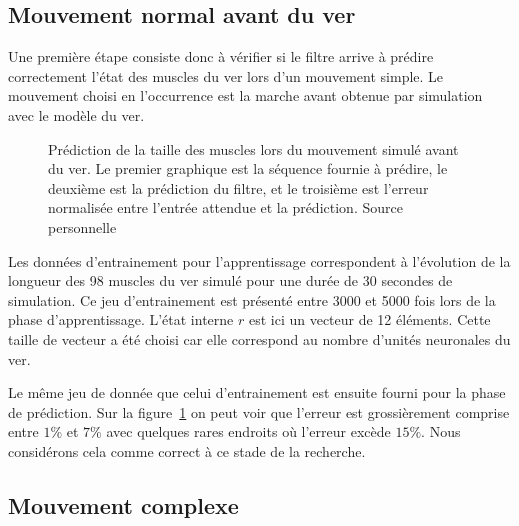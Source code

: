\subsection{Mouvement normal avant du ver} %
\label{sub:Mouvement normal avant du ver}

Une première étape consiste donc à vérifier si le filtre arrive à prédire 
correctement l'état des muscles du ver lors d'un mouvement simple. Le mouvement
choisi en l'occurrence est la marche avant obtenue par simulation avec le
modèle du ver.

\begin{figure}[ht]
   \begin{center}
   \end{center}
   \caption[Prédiction de la taille des muscles lors du mouvement simulé
   avant du ver]{Prédiction de la taille des muscles lors du mouvement simulé
   avant du ver. Le premier graphique est la séquence fournie à prédire, le
   deuxième est la prédiction du filtre, et le troisième est l'erreur normalisée
   entre l'entrée attendue et la prédiction. Source personnelle}
   \label{fig:sequence_ver_complet}
\end{figure}

Les données d'entrainement pour l'apprentissage correspondent à l'évolution de
la longueur des 98 muscles du ver simulé pour une durée de 30 secondes de
simulation. Ce jeu d'entrainement est présenté entre 3000 et 5000 fois lors de la
phase d'apprentissage. L'état interne $r$ est ici un vecteur de 12 éléments.
Cette taille de vecteur a été choisi car elle correspond au nombre d'unités
neuronales du ver.

Le même jeu de donnée que celui d'entrainement est ensuite fourni pour la phase
de prédiction. Sur la figure~\ref{fig:sequence_ver_complet} on peut voir que l'erreur
est grossièrement comprise entre $1\%$ et $7\%$ avec quelques rares endroits où l'erreur
excède $15\%$. Nous considérons cela comme correct à ce stade de la recherche.


\subsection{Mouvement complexe} %
\label{sub:Mouvement complexe}

